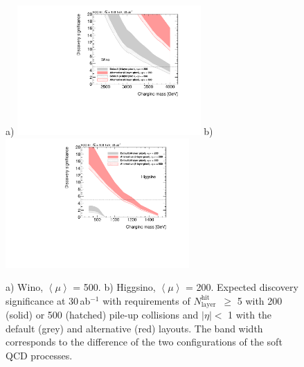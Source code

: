 \documentclass[11pt,twoside,a4paper]{cernrep}
\begin{document}
\begin{figure}
  \centering
  a)
  \includegraphics[width=7cm]{h_Significance_wino12_eta_5hits.pdf}
  b)
  \includegraphics[width=7cm]{h_Significance_higgsino12_eta_5hits.pdf}
  \caption{ a) Wino, $\left< \mu\right>$ {=} 500. b) Higgsino, $\left< \mu\right>$ {=} 200. Expected discovery significance at 30\,ab${}^{-1}$ with requirements of \ensuremath{N_{\mathrm{layer}}^{\mathrm{hit}}}~$\geq$ 5 with 200 (solid) or 500 (hatched) pile-up collisions and $|\eta|<$ 1 with the default (grey) and alternative (red) layouts.
            The band width corresponds to the difference of the two configurations of the soft QCD processes.}
  \label{figure:SignificanceEta1}
\end{figure}



\end{document}
